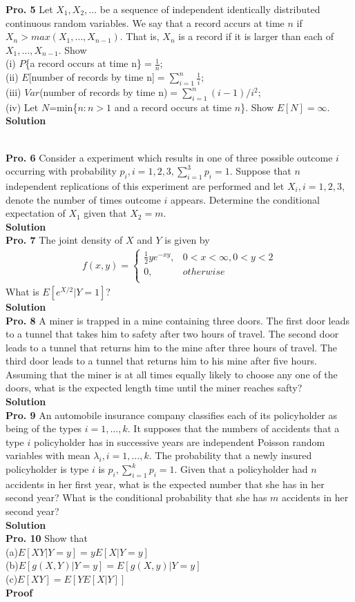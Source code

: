 \documentclass[12pt,onecolumn,journal]{IEEEtran}
\begin{document}
\textbf{Pro. 5} Let $X_1, X_2, \ldots$ be a sequence of independent identically distributed continuous random variables. We say that a record accurs at time $n$ if $X_n>max(X_1,\ldots,X_{n-1})$. That is, $X_n$ is a record if it is larger than each of $X_1,\ldots,X_{n-1}$. Show\\
(i) $P$\{a record occurs at time n\}$=\frac{1}{n}$;\\
(ii) $E$[number of records by time n]$=\sum^n_{i=1}{\frac{1}{i}}$;\\
(iii) $Var$(number of records by time n)$=\sum^n_{i=1}{(i-1)/i^2}$;\\
(iv) Let $N$=min\{$n:n>1$ and a record occurs at time $n$\}. Show $E[N]=\infty$.
\\
\textbf{Solution}
\textcolor[rgb]{1,0,0}
{
    
}
\\
\textbf{Pro. 6} Consider a experiment which results in one of three possible outcome $i$ occurring with probability $p_i,i=1,2,3,\sum^3_{i=1}{p_i}=1$. Suppose that $n$ independent replications of this experiment are performed and let $X_i,i=1,2,3$, denote the number of times outcome $i$ appears. Determine the conditional expectation of $X_1$ given that $X_2=m$.
\\
\textbf{Solution}
\\
\textbf{Pro. 7} The joint density of $X$ and $Y$ is given by
\begin{eqnarray*}%
f(x,y)=
               \begin{cases}
                \frac{1}{2}ye^{-xy},    & 0<x<\infty,0<y<2 \\
                 0,  & otherwise\\
               \end{cases}
\end{eqnarray*}
What is $E[e^{X/2}|Y=1]$?
\\
\textbf{Solution}
\\
\textbf{Pro. 8} A miner is trapped in a mine containing three doors. The first door leads to a tunnel that takes him to safety after two hours of travel. The second door leads to a tunnel that returns him to the mine after three hours of travel. The third door leads to a tunnel that returns him to his mine after five hours. Assuming that the miner is at all times equally likely to choose any one of the doors, what is the expected length time until the miner reaches safty?
\\
\textbf{Solution}
\\
\textbf{Pro. 9} An automobile insurance company classifies each of its policyholder as being of the types $i=1,\ldots,k$. It supposes that the numbers of accidents that a type $i$ policyholder has in successive years are independent Poisson random variables with mean $\lambda_i,i=1,\ldots,k$. The probability that a newly insured policyholder is type $i$ is $p_i,\sum^k_{i=1}{p_i}=1$. Given that a policyholder had $n$ accidents in her first year, what is the expected number that she has in her second year? What is the conditional probability that she has $m$ accidents in her second year?\\
\textbf{Solution}
\\
\textbf{Pro. 10} Show that\\
\quad\quad(a)$E[XY|Y=y]=yE[X|Y=y]$\\
\quad\quad(b)$ E[g(X,Y)|Y=y]=E[g(X,y)|Y=y]$\\
\quad\quad(c)$ E[XY]=E[YE[X|Y]]$\\
\textbf{Proof}
\end{document}

